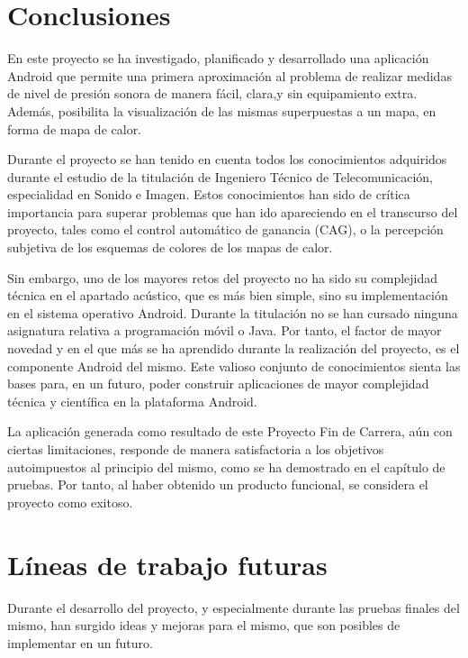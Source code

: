 \label{chp:concl}
\section{Conclusiones}
    En este proyecto se ha investigado, planificado y desarrollado una aplicación Android que permite una primera aproximación al problema de realizar medidas de nivel de presión sonora de manera fácil, clara,y sin equipamiento extra. Además, posibilita la visualización de las mismas superpuestas a un mapa, en forma de mapa de calor.

    Durante el proyecto se han tenido en cuenta todos los conocimientos adquiridos durante el estudio de la titulación de Ingeniero Técnico de Telecomunicación, especialidad en Sonido e Imagen. Estos conocimientos han sido de crítica importancia para superar problemas que han ido apareciendo en el transcurso del proyecto, tales como el control automático de ganancia (CAG), o la percepción subjetiva de los esquemas de colores de los mapas de calor. 
    
    Sin embargo, uno de los mayores retos del proyecto no ha sido su complejidad técnica en el apartado acústico, que es más bien simple, sino su implementación en el sistema operativo Android. Durante la titulación no se han cursado ninguna asignatura relativa a programación móvil o Java. Por tanto, el  factor de mayor novedad y en el que más se ha aprendido durante la realización del proyecto, es el componente Android del mismo. Este valioso conjunto de conocimientos sienta las bases para, en un futuro, poder construir aplicaciones de mayor complejidad técnica y científica en la plataforma Android.
    
    La aplicación generada como resultado de este Proyecto Fin de Carrera, aún con ciertas limitaciones, responde de manera satisfactoria a los objetivos autoimpuestos al principio del mismo, como se ha demostrado en el capítulo de pruebas. Por tanto, al haber obtenido un producto funcional, se considera el proyecto como exitoso.
    
\section{Líneas de trabajo futuras}
    Durante el desarrollo del proyecto, y especialmente durante las pruebas finales del mismo, han surgido ideas y mejoras para el mismo, que son posibles de implementar en un futuro.
     
